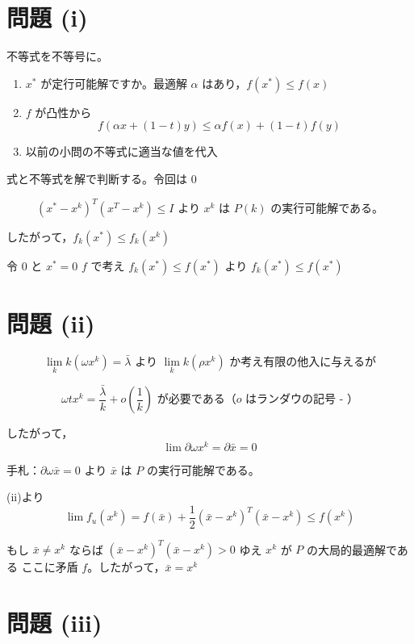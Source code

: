 \documentclass[12pt,a4paper]{article}
\begin{document}
\section*{問題 (i)}

不等式を不等号に。

\begin{enumerate}
  \item[\textcircled{1}] $x^*$ が定行可能解ですか。最適解 $\alpha$ はあり，$f(x^*) \leq f(x)$
  
  \item[\textcircled{2}] $f$ が凸性から 
  \[f(\alpha x + (1-t)y) \leq \alpha f(x) + (1-t)f(y)\]
  
  \item[\textcircled{3}] 以前の小問の不等式に適当な値を代入
\end{enumerate}

式と不等式を解で判断する。令回は $0$

\[(x^* - x^k)^T(x^T - x^k) \leq I \text{ より } x^k \text{ は } P(k) \text{ の実行可能解である。}\]

したがって，$f_k(x^*) \leq f_k(x^k)$

令 $0$ と $x^* = 0$ $f$ で考え $f_k(x^*) \leq f(x^*)$ より $f_k(x^*) \leq f(x^*)$

\section*{問題 (ii)}

\[\lim_k k(\omega x^k) = \bar{\lambda} \text{ より } \lim_k k(\rho x^k) \text{ か考え有限の他入に与えるが}\]

\[\omega t x^k = \frac{\bar{\lambda}}{k} + o\left(\frac{1}{k}\right) \text{ が必要である（$o$ はランダウの記号 - ）}\]

したがって，
\[\lim \partial \omega x^k = \partial \bar{x} = 0\]

手札：$\partial \omega \bar{x} = 0$ より $\bar{x}$ は $P$ の実行可能解である。

(ii)より 
\[\lim f_u(x^k) = f(\bar{x}) + \frac{1}{2}(\bar{x} - x^k)^T(\bar{x} - x^k) \leq f(x^k)\]

もし $\bar{x} \neq x^k$ ならば $(\bar{x} - x^k)^T(\bar{x} - x^k) > 0$ ゆえ $x^k$ が $P$ の大局的最適解である
ここに矛盾 $f$。したがって，$\bar{x} = x^k$

\section*{問題 (iii)}
\end{document}

